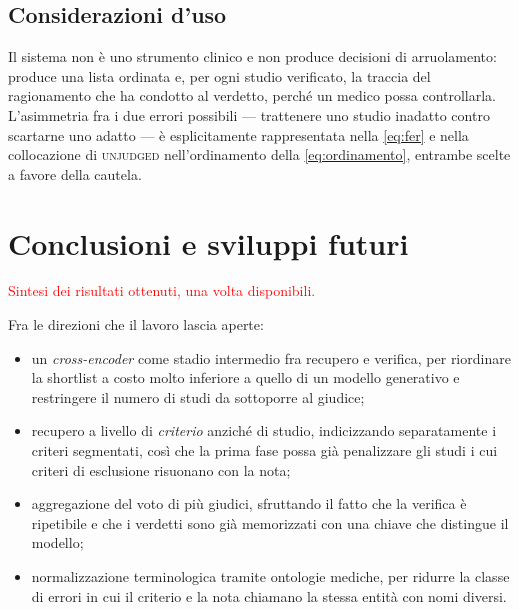 \documentclass[pdflatex,sn-mathphys-num]{sn-jnl}
\theoremstyle{thmstyleone}
\theoremstyle{thmstyletwo}
\theoremstyle{thmstylethree}
\newcommand{\ev}[1]{\textcolor{red}{#1}}
\begin{document}
\subsection{Considerazioni d'uso}\label{sec:disc-uso}

Il sistema non è uno strumento clinico e non produce decisioni di arruolamento: produce una lista ordinata e, per ogni studio verificato, la traccia del ragionamento che ha condotto al verdetto, perché un medico possa controllarla. L'asimmetria fra i due errori possibili --- trattenere uno studio inadatto contro scartarne uno adatto --- è esplicitamente rappresentata nella \eqref{eq:fer} e nella collocazione di \textsc{unjudged} nell'ordinamento della \eqref{eq:ordinamento}, entrambe scelte a favore della cautela.

\section{Conclusioni e sviluppi futuri}\label{sec:conclusioni}

\ev{Sintesi dei risultati ottenuti, una volta disponibili.}

Fra le direzioni che il lavoro lascia aperte:

\begin{itemize}
  \item un \emph{cross-encoder} come stadio intermedio fra recupero e verifica, per riordinare la shortlist a costo molto inferiore a quello di un modello generativo e restringere il numero di studi da sottoporre al giudice;
  \item recupero a livello di \emph{criterio} anziché di studio, indicizzando separatamente i criteri segmentati, così che la prima fase possa già penalizzare gli studi i cui criteri di esclusione risuonano con la nota;
  \item aggregazione del voto di più giudici, sfruttando il fatto che la verifica è ripetibile e che i verdetti sono già memorizzati con una chiave che distingue il modello;
  \item normalizzazione terminologica tramite ontologie mediche, per ridurre la classe di errori in cui il criterio e la nota chiamano la stessa entità con nomi diversi.
\end{itemize}
\end{document}

